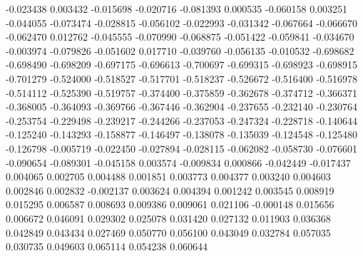 -0.023438
0.003432
-0.015698
-0.020716
-0.081393
0.000535
-0.060158
0.003251
-0.044055
-0.073474
-0.028815
-0.056102
-0.022993
-0.031342
-0.067664
-0.066670
-0.062470
0.012762
-0.045555
-0.070990
-0.068875
-0.051422
-0.059841
-0.034670
-0.003974
-0.079826
-0.051602
0.017710
-0.039760
-0.056135
-0.010532
-0.698682
-0.698490
-0.698209
-0.697175
-0.696613
-0.700697
-0.699315
-0.698923
-0.698915
-0.701279
-0.524000
-0.518527
-0.517701
-0.518237
-0.526672
-0.516400
-0.516978
-0.514112
-0.525390
-0.519757
-0.374400
-0.375859
-0.362678
-0.374712
-0.366371
-0.368005
-0.364093
-0.369766
-0.367446
-0.362904
-0.237655
-0.232140
-0.230764
-0.253754
-0.229498
-0.239217
-0.244266
-0.237053
-0.247324
-0.228718
-0.140644
-0.125240
-0.143293
-0.158877
-0.146497
-0.138078
-0.135039
-0.124548
-0.125480
-0.126798
-0.005719
-0.022450
-0.027894
-0.028115
-0.062082
-0.058730
-0.076601
-0.090654
-0.089301
-0.045158
0.003574
-0.009834
0.000866
-0.042449
-0.017437
0.004065
0.002705
0.004488
0.001851
0.003773
0.004377
0.003240
0.004603
0.002846
0.002832
-0.002137
0.003624
0.004394
0.001242
0.003545
0.008919
0.015295
0.006587
0.008693
0.009386
0.009061
0.021106
-0.000148
0.015656
0.006672
0.046091
0.029302
0.025078
0.031420
0.027132
0.011903
0.036368
0.042849
0.043434
0.027469
0.050770
0.056100
0.043049
0.032784
0.057035
0.030735
0.049603
0.065114
0.054238
0.060644
